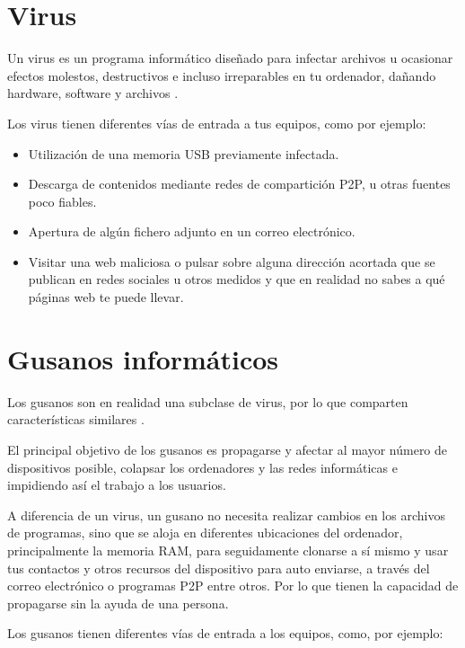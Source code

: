 \documentclass[
  a4paper,
  openany]{book}
\begin{document}
\hypertarget{virus}{%
\section{Virus}\label{virus}}

Un virus es un programa informático diseñado para infectar archivos u ocasionar efectos molestos, destructivos e incluso irreparables en tu ordenador, dañando hardware, software y archivos \citep{PANDA-virus}.

Los virus tienen diferentes vías de entrada a tus equipos, como por ejemplo:

\begin{itemize}
\item
  Utilización de una memoria USB previamente infectada.
\item
  Descarga de contenidos mediante redes de compartición P2P, u otras fuentes poco fiables.
\item
  Apertura de algún fichero adjunto en un correo electrónico.
\item
  Visitar una web maliciosa o pulsar sobre alguna dirección acortada que se publican en redes sociales u otros medidos y que en realidad no sabes a qué páginas web te puede llevar.
\end{itemize}

\hypertarget{gusanos-informuxe1ticos}{%
\section{Gusanos informáticos}\label{gusanos-informuxe1ticos}}

Los gusanos son en realidad una subclase de virus, por lo que comparten características similares \citep{PANDA-gusano}.

El principal objetivo de los gusanos es propagarse y afectar al mayor número de dispositivos posible, colapsar los ordenadores y las redes informáticas e impidiendo así el trabajo a los usuarios.

A diferencia de un virus, un gusano no necesita realizar cambios en los archivos de programas, sino que se aloja en diferentes ubicaciones del ordenador, principalmente la memoria RAM, para seguidamente clonarse a sí mismo y usar tus contactos y otros recursos del dispositivo para auto enviarse, a través del correo electrónico o programas P2P entre otros. Por lo que tienen la capacidad de propagarse sin la ayuda de una persona.

Los gusanos tienen diferentes vías de entrada a los equipos, como, por ejemplo:
\end{document}
